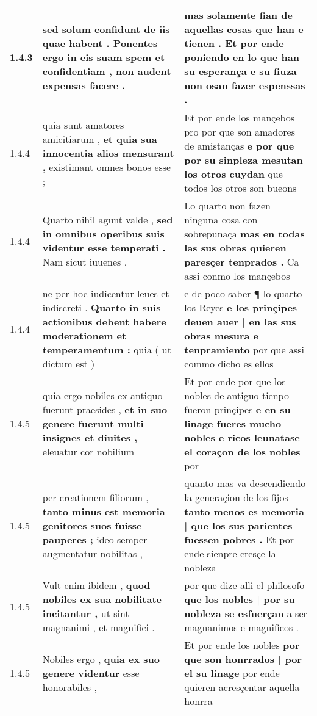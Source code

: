 \begin{tabular}{|p{1cm}|p{6.5cm}|p{6.5cm}|}
1.4.3 & sed solum confidunt de iis quae habent . \textbf{ Ponentes ergo in eis suam spem et confidentiam , } non audent expensas facere . & mas solamente fian de aquellas cosas que han e tienen . \textbf{ Et por ende poniendo en lo que han su esperança } e su fiuza non osan fazer espenssas . \\\hline
1.4.4 & quia sunt amatores amicitiarum , \textbf{ et quia sua innocentia alios mensurant , } existimant omnes bonos esse ; & Et por ende los mançebos pro por que son amadores de amistanças \textbf{ e por que por su sinpleza mesutan los otros cuydan } que todos los otros son bueons \\\hline
1.4.4 & Quarto nihil agunt valde , \textbf{ sed in omnibus operibus suis videntur esse temperati . } Nam sicut iuuenes , & Lo quarto non fazen ninguna cosa con sobrepunaça \textbf{ mas en todas las sus obras quieren paresçer tenprados . } Ca assi conmo los mançebos \\\hline
1.4.4 & ne per hoc iudicentur leues et indiscreti . \textbf{ Quarto in suis actionibus debent habere moderationem et temperamentum : } quia ( ut dictum est ) & e de poco saber ¶ lo quarto los Reyes \textbf{ e los prinçipes deuen auer | en las sus obras mesura e tenpramiento } por que assi commo dicho es ellos \\\hline
1.4.5 & quia ergo nobiles ex antiquo fuerunt praesides , \textbf{ et in suo genere fuerunt multi insignes et diuites , } eleuatur cor nobilium & Et por ende por que los nobles de antiguo tienpo fueron prinçipes \textbf{ e en su linage fueres mucho nobles e ricos leunatase el coraçon de los nobles } por \\\hline
1.4.5 & per creationem filiorum , \textbf{ tanto minus est memoria genitores suos fuisse pauperes ; } ideo semper augmentatur nobilitas , & quanto mas va descendiendo la generaçion de los fijos \textbf{ tanto menos es memoria | que los sus parientes fuessen pobres . } Et por ende sienpre cresçe la nobleza \\\hline
1.4.5 & Vult enim ibidem , \textbf{ quod nobiles ex sua nobilitate incitantur , } ut sint magnanimi , et magnifici . & por que dize alli el philosofo \textbf{ que los nobles | por su nobleza se esfuerçan } a ser magnanimos e magnificos . \\\hline
1.4.5 & Nobiles ergo , \textbf{ quia ex suo genere videntur } esse honorabiles , & Et por ende los nobles \textbf{ por que son honrrados | por el su linage } por ende quieren acresçentar aquella honrra \\\hline

\end{tabular}
